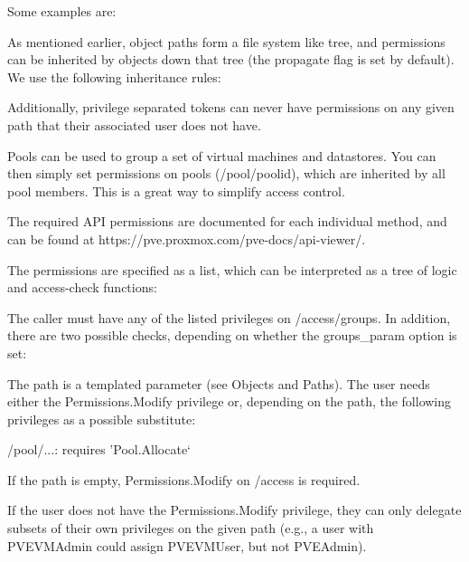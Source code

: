 Some examples are:

As mentioned earlier, object paths form a file system like tree, and permissions can be inherited by objects down that tree (the propagate flag is set by default). We use the following inheritance rules:

Additionally, privilege separated tokens can never have permissions on any given path that their associated user does not have.

Pools can be used to group a set of virtual machines and datastores. You can then simply set permissions on pools (/pool/{poolid}), which are inherited by all pool members. This is a great way to simplify access control.

The required API permissions are documented for each individual method, and can be found at https://pve.proxmox.com/pve-docs/api-viewer/.

The permissions are specified as a list, which can be interpreted as a tree of logic and access-check functions:

The caller must have any of the listed privileges on /access/groups. In addition, there are two possible checks, depending on whether the groups_param option is set:

The path is a templated parameter (see Objects and Paths). The user needs either the Permissions.Modify privilege or, depending on the path, the following privileges as a possible substitute:

/pool/...: requires 'Pool.Allocate`

If the path is empty, Permissions.Modify on /access is required.

If the user does not have the Permissions.Modify privilege, they can only delegate subsets of their own privileges on the given path (e.g., a user with PVEVMAdmin could assign PVEVMUser, but not PVEAdmin).

